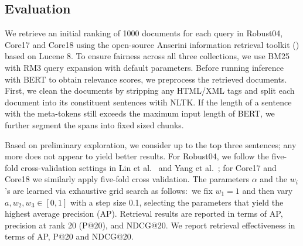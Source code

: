 \subsection{Evaluation}

We retrieve an initial ranking of 1000 documents for each query in Robust04, Core17 and Core18 using the open-source Anserini information retrieval toolkit () based on Lucene 8.
To ensure fairness across all three collections, we use BM25 with RM3 query expansion with default parameters.
Before running inference with BERT to obtain relevance scores, we preprocess the retrieved documents.
First, we clean the documents by stripping any HTML/XML tags and split each document into its constituent sentences witih NLTK.
If the length of a sentence with the meta-tokens still exceeds the maximum input length of BERT, we further segment the spans into fixed sized chunks.

Based on preliminary exploration, we consider up to the top three sentences; any more does not appear to yield better results.
For Robust04, we follow the five-fold cross-validation settings in Lin et al.~\cite{lin2019neural} and Yang et al.~\cite{Yang_etal_SIGIR2019}; for Core17 and Core18 we similarly apply five-fold cross validation.
The parameters $\alpha$ and the $w_i$'s are learned via exhaustive grid search as follows:\ we fix $ w_1 = 1 $ and then vary $ a, w_2, w_3 \in [0, 1] $ with a step size 0.1, selecting the parameters that yield the highest average precision (AP).
Retrieval results are reported in terms of AP, precision at rank 20 (P@20), and NDCG@20.
We report retrieval effectiveness in terms of AP, P@20 and NDCG@20.